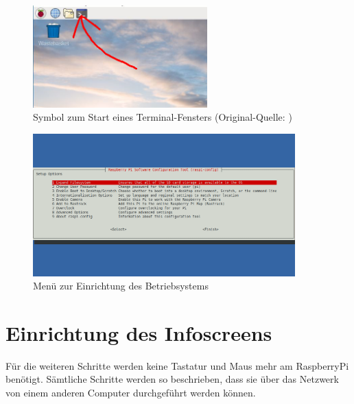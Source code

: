 \begin{figure}[h!]
	\centering
		\includegraphics[width=0.6\textwidth]{./fotos/desktop-pixel-term.jpg}
	\caption{Symbol zum Start eines Terminal-Fensters (Original-Quelle: \cite{deskp})}
	\label{fig:rpiterminal}
\end{figure}

\begin{figure}[h!]
	\centering
		\includegraphics[width=0.9\textwidth]{./fotos/menu1.png}
	\caption{Menü zur Einrichtung des Betriebsystems}
	\label{fig:menu}
\end{figure}

\clearpage

\section{Einrichtung des Infoscreens}
\label{sec:stepssetup}
Für die weiteren Schritte werden keine Tastatur und Maus mehr am RaspberryPi benötigt. 
Sämtliche Schritte werden so beschrieben, dass sie über das Netzwerk von einem anderen Computer durchgeführt werden können.

